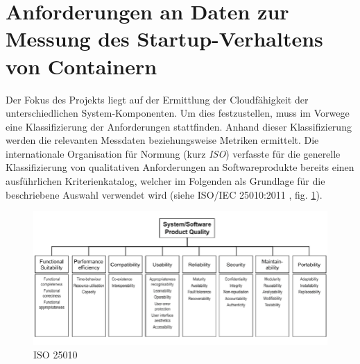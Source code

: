 \section{Anforderungen an Daten zur Messung des Startup-Verhaltens von Containern \checkmark}
\label{sec:startupAnforderungen}


Der Fokus des Projekts liegt auf der Ermittlung der Cloudfähigkeit der unterschiedlichen System-Komponenten. Um dies festzustellen, muss im Vorwege eine Klassifizierung der Anforderungen stattfinden. Anhand dieser Klassifizierung werden die relevanten Messdaten beziehungsweise Metriken ermittelt. Die internationale Organisation für Normung (kurz \emph{ISO}) verfasste für die generelle Klassifizierung von qualitativen Anforderungen an Softwareprodukte bereits einen ausführlichen Kriterienkatalog, welcher im Folgenden als Grundlage für die beschriebene Auswahl verwendet wird (siehe ISO/IEC 25010:2011 \cite{iso25010}, fig. \ref{fig:iso25010}). 

\begin{figure}[ht!]
	\centering
	\includegraphics[width=\linewidth]{kapitel/vorgehensmodell/kriterienkatalog/_img/iso25010}
	\caption[iso25010]{ISO 25010}
	\label{fig:iso25010}
\end{figure}

